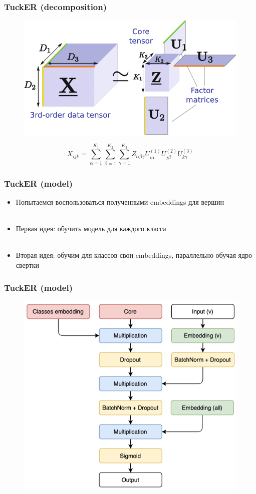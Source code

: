 \documentclass{beamer}
\newcommand{\skipline}[0]{$ $\\}
\begin{document}
\begin{frame}
    \frametitle{TuckER (decomposition)}
    \begin{figure}
        \includegraphics[width=0.6\columnwidth]{Tucker-decomposition.png}
    \end{figure}
    $$
    X_{ijk} = \sum_{\alpha=1}^{K_1} \sum_{\beta=1}^{K_2} \sum_{\gamma=1}^{K_3} 
    Z_{\alpha\beta\gamma} U^{(1)}_{i \alpha} U^{(2)}_{j \beta} U^{(3)}_{k \gamma} 
    $$
\end{frame}

\begin{frame}
    \frametitle{TuckER (model)}
    \begin{itemize}
        \item Попытаемся воспользоваться полученными embeddings для вершин
        \skipline
        \skipline
        \item Первая идея: обучить модель для каждого класса
        \skipline
        \skipline
        \item Вторая идея: обучим для классов свои embeddings, параллельно обучая ядро свертки
    \end{itemize}
\end{frame}

\begin{frame}
    \frametitle{TuckER (model)}
    \begin{figure}
        \includegraphics[width=0.7\columnwidth]{Diagram.png}
    \end{figure}
\end{frame}
\end{document}
